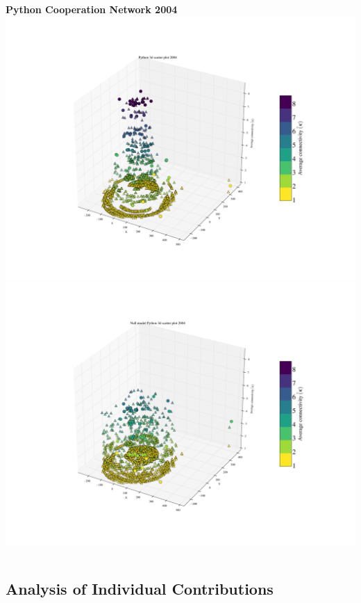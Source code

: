 \documentclass[ignorenonframetext,red,8pt,notes=show]{beamer}
\begin{document}
\begin{frame}
\begin{columns}[c]
\begin{column}{0.5\textwidth}
\begin{center}
\textbf{Python Cooperation Network 2004}
\includegraphics[scale=0.12]{../../figures/3d_scatter_python_2004}
\newline
\includegraphics[scale=0.12]{../../figures/3d_scatter_python_2004_null}
\end{center}
\end{column}
\end{columns}

\end{frame}

\subsection{Analysis of Individual Contributions}
\end{document}
